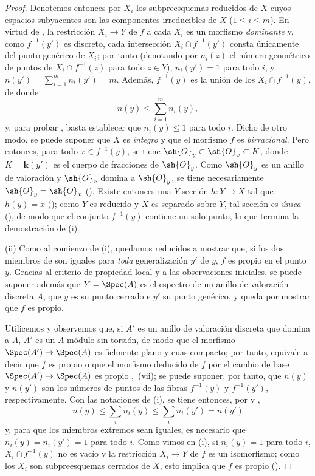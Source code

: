 \begin{proof}
Denotemos entonces por $X_i$ los subpreesquemas reducidos de $X$ cuyos espacios subyacentes son las componentes irreducibles de $X$ ($1\leq i\leq m$).
En virtud de , la restricción $X_i\to Y$ de $f$ a cada $X_i$ es un morfismo \emph{dominante} y, como $f^{-1}(y')$ es discreto, cada intersección $X_i\cap f^{-1}(y')$ consta únicamente del punto genérico de $X_i$; por tanto (denotando por $n_i(z)$ el número geométrico de puntos de $X_i\cap f^{-1}(z)$ para todo $z\in Y$), $n_i(y')=1$ para todo $i$, y $n(y')=\sum_{i=1}^{m} n_i(y')=m$.
Además, $f^{-1}(y)$ es la unión de los $X_i\cap f^{-1}(y)$, de donde
\begin{equation}
\tag{15.5.2.3}
\label{IV.15.5.2.3}
  n(y) \leq \sum_{i=1}^{m} n_i(y),
\end{equation}
y, para probar , basta establecer que $n_i(y)\leq 1$ para todo $i$.
Dicho de otro modo, se puede suponer que $X$ es \emph{íntegro} y que el morfismo $f$ es \emph{birracional}.
Pero entonces, para todo $x\in f^{-1}(y)$, se tiene $\sh{O}_y\subset\sh{O}_x\subset K$, donde $K=\boldsymbol{k}(y')$ es el cuerpo de fracciones de $\sh{O}_y$.
Como $\sh{O}_y$ es un anillo de valoración y $\sh{O}_x$ domina a $\sh{O}_y$, se tiene necesariamente $\sh{O}_y=\sh{O}_x$ ().
Existe entonces una $Y$-sección $h:Y\to X$ tal que $h(y)=x$ (); como $Y$ es reducido y $X$ es separado sobre $Y$, tal sección es \emph{única} (), de modo que el conjunto $f^{-1}(y)$ contiene un solo punto, lo que termina la demostración de (i).

(ii)
Como al comienzo de (i), quedamos reducidos a mostrar que, si los dos miembros de  son iguales para \emph{toda} generalización $y'$ de $y$, $f$ es propio en el punto $y$.
Gracias al criterio de propiedad local  y a las observaciones iniciales, se puede suponer además que $Y=\Spec(A)$ es el espectro de un anillo de valoración discreta $A$, que $y$ es su punto cerrado e $y'$ su punto genérico, y queda por mostrar que $f$ es propio.

Utilicemos  y observemos que, si $A'$ es un anillo de valoración discreta que domina a $A$, $A'$ es un $A$-módulo sin torsión, de modo que el morfismo $\Spec(A')\to\Spec(A)$ es fielmente plano y cuasicompacto; por tanto, equivale a decir que $f$ es propio o que el morfismo deducido de $f$ por el cambio de base $\Spec(A')\to\Spec(A)$ es
propio ,~(vii); se puede suponer, por tanto, que $n(y)$ y $n(y')$ son los números de puntos de las fibras $f^{-1}(y)$ y $f^{-1}(y')$, respectivamente.
Con las notaciones de (i), se tiene entonces, por  y ,
\begin{equation}
\tag{15.5.2.4}
\label{IV.15.5.2.4}
  n(y) \leq \sum_i n_i(y) \leq \sum_i n_i(y') = n(y')
\end{equation}
y, para que los miembros extremos sean iguales, es necesario que $n_i(y)=n_i(y')=1$ para todo $i$.
Como vimos en (i), si $n_i(y)=1$ para todo $i$, $X_i\cap f^{-1}(y)$ no es vacío y la restricción $X_i\to Y$ de $f$ es un isomorfismo; como los $X_i$ son subpreesquemas cerrados de $X$, esto implica que $f$ es propio ().


\end{proof}

